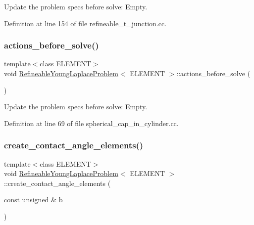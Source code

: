 Update the problem specs before solve\+: Empty. 



Definition at line 154 of file refineable\+\_\+t\+\_\+junction.\+cc.

\mbox{\label{classRefineableYoungLaplaceProblem_af2a639c1cdfd6334c9023c6bfbe69c8a}} 
\subsubsection{\texorpdfstring{actions\+\_\+before\+\_\+solve()}{actions\_before\_solve()}}
{\footnotesize\ttfamily template$<$class E\+L\+E\+M\+E\+NT$>$ \\
void \hyperlink{classRefineableYoungLaplaceProblem}{Refineable\+Young\+Laplace\+Problem}$<$ E\+L\+E\+M\+E\+NT $>$\+::actions\+\_\+before\+\_\+solve (\begin{DoxyParamCaption}{ }\end{DoxyParamCaption})\hspace{0.3cm}{\ttfamily [inline]}}



Update the problem specs before solve\+: Empty. 



Definition at line 69 of file spherical\+\_\+cap\+\_\+in\+\_\+cylinder.\+cc.

\mbox{\label{classRefineableYoungLaplaceProblem_a00d1304e030120e76d9f316dd4053116}} 
\subsubsection{\texorpdfstring{create\+\_\+contact\+\_\+angle\+\_\+elements()}{create\_contact\_angle\_elements()}\hspace{0.1cm}{\footnotesize\ttfamily [1/2]}}
{\footnotesize\ttfamily template$<$class E\+L\+E\+M\+E\+NT$>$ \\
void \hyperlink{classRefineableYoungLaplaceProblem}{Refineable\+Young\+Laplace\+Problem}$<$ E\+L\+E\+M\+E\+NT $>$\+::create\+\_\+contact\+\_\+angle\+\_\+elements (\begin{DoxyParamCaption}\item[{const unsigned \&}]{b }\end{DoxyParamCaption})\hspace{0.3cm}{\ttfamily [private]}}



